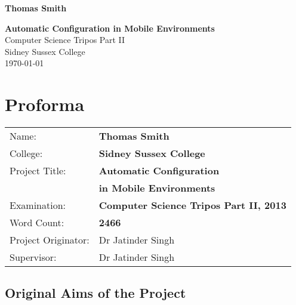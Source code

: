 \documentclass[12pt,twoside,notitlepage]{report}
\begin{document}





\pagestyle{empty}

\hfill{\LARGE \bf Thomas Smith}

\vspace*{60mm}
\begin{center}
\Huge
{\bf Automatic Configuration in Mobile Environments} \\
\vspace*{5mm}
Computer Science Tripos Part II \\
\vspace*{5mm}
Sidney Sussex College \\
\vspace*{5mm}
\today  %
\end{center}

\cleardoublepage


\setcounter{page}{1}
\pagestyle{plain}

\chapter*{Proforma}

{\large
\begin{tabular}{ll}
Name:               & \bf Thomas Smith	\\
College:            & \bf Sidney Sussex College	\\
Project Title:      & \bf Automatic Configuration \\ &\bf in Mobile Environments	\\
Examination:        & \bf Computer Science Tripos Part II, 2013 	\\
Word Count:         & \bf 2466\footnotemark[1] \\
Project Originator: & Dr Jatinder Singh		\\
Supervisor:         & Dr Jatinder Singh		\\ 
\end{tabular}
}



\section*{Original Aims of the Project}
\end{document}
